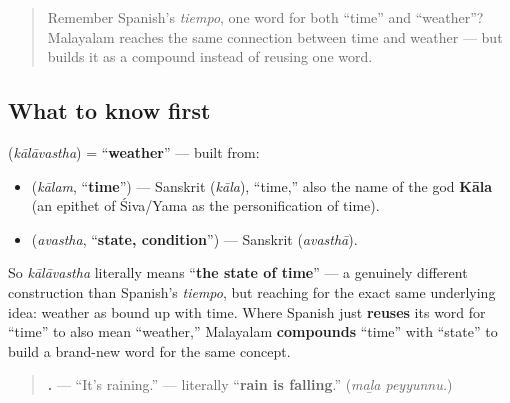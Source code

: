 \label{lesson:ML-C20-kalavastha}



\begin{quote}
Remember Spanish's \emph{tiempo}, one word for both \textquotedblleft{}time\textquotedblright{} and \textquotedblleft{}weather\textquotedblright{}? Malayalam reaches the same connection between time and weather — but builds it as a compound instead of reusing one word.
\end{quote}

\subsection*{What to know first}
\textbf{} (\emph{kālāvastha}) = \textquotedblleft{}\textbf{weather}\textquotedblright{} — built from:

\begin{itemize}
\raggedright
  \item \textbf{} (\emph{kālam}, \textquotedblleft{}\textbf{time}\textquotedblright{}) — Sanskrit \textbf{} (\emph{kāla}), \textquotedblleft{}time,\textquotedblright{} also the name of the god \textbf{Kāla} (an epithet of Śiva/Yama as the personification of time).
  \item \textbf{} (\emph{avastha}, \textquotedblleft{}\textbf{state, condition}\textquotedblright{}) — Sanskrit \textbf{} (\emph{avasthā}).
\end{itemize}

So \emph{kālāvastha} literally means \textquotedblleft{}\textbf{the state of time}\textquotedblright{} — a genuinely different construction than Spanish's \emph{tiempo}, but reaching for the exact same underlying idea: weather as bound up with time. Where Spanish just \textbf{reuses} its word for \textquotedblleft{}time\textquotedblright{} to also mean \textquotedblleft{}weather,\textquotedblright{} Malayalam \textbf{compounds} \textquotedblleft{}time\textquotedblright{} with \textquotedblleft{}state\textquotedblright{} to build a brand-new word for the same concept.

\begin{cousinweb}
\begin{quote}
\textbf{ .} — \textquotedblleft{}It's raining.\textquotedblright{} — literally \textquotedblleft{}\textbf{rain is falling}.\textquotedblright{} (\emph{maḻa peyyunnu.})
\end{quote}
\end{cousinweb}

